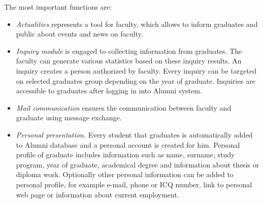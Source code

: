 \documentclass{iitsrc}[2006/14/02]
\begin{document}
The most important functions are:
\begin{itemize}

\item {\em Actualities} 
represents a tool for faculty, which allows to inform graduates and public about events and news on faculty.

\item {\em Inquiry module}
is engaged to collecting information from graduates. The faculty can generate various statistics based on these inquiry results. An inquiry creates a person authorized by faculty. Every inquiry can be targeted on selected graduates group depending on the year of graduate. Inquiries are accessible to graduates after logging in into Alumni system.

\item {\em Mail communication} ensures the communication between faculty and graduate using message exchange.

\item {\em Personal presentation.}
Every student that graduates is automatically added to Alumni database and a personal account is created for him. Personal profile of graduate includes information such as name, surname, study program, year of graduate, academical degree and information about thesis or diploma work. Optionally other personal information can be added to personal profile, for example e-mail, phone or ICQ number, link to personal web page or information about current employment. 


\end{itemize}
\end{document}
